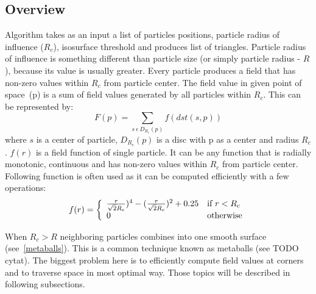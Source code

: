 \subsection{Overview} \label{sec:iso_overview}
Algorithm takes as an input a list of particles positions, particle radius of influence ($R_c$), isosurface threshold and produces list of triangles. Particle radius of influence is something different than particle size (or simply particle radius - $R$), because its value is usually greater. Every particle produces a field that has non-zero values within $R_c$ from particle center. The field value in given point of space~(p) is a sum of field values generated by all particles within $R_c$. This can be represented by:
\begin{equation}
\label{eq:field_equation}
F(p) = \sum_{s~\epsilon~D_{R_c}(p)} f(dst(s, p))
\end{equation}
where $s$ is a center of particle, $D_{R_c}(p)$ is a disc with p as a center and radius $R_c$. $f(r)$ is a field function of single particle. It can be any function that is radially monotonic, continuous and has non-zero values within $R_c$ from particle center. Following function is often used as it can be computed efficiently with a few operations:
\begin{equation}
\label{eq:single_field_equation}
f(r) = \left\{ \begin{array}{ll}
{r \over \sqrt{2}R_c} )^4 - ( {r \over \sqrt{2}R_c} )^2 + 0.25 & \textrm{if $r < R_c$}\\
0 & \textrm{otherwise}\\
\end{array} \right.
\end{equation}

When $R_c > R$ neighboring particles combines into one smooth surface  (see~\ref{metaballs}). This is a common technique known as metaballs (see TODO cytat). The biggest problem here is to efficiently compute field values at corners and to traverse space in most optimal way. Those topics will be described in following subsections.
 

